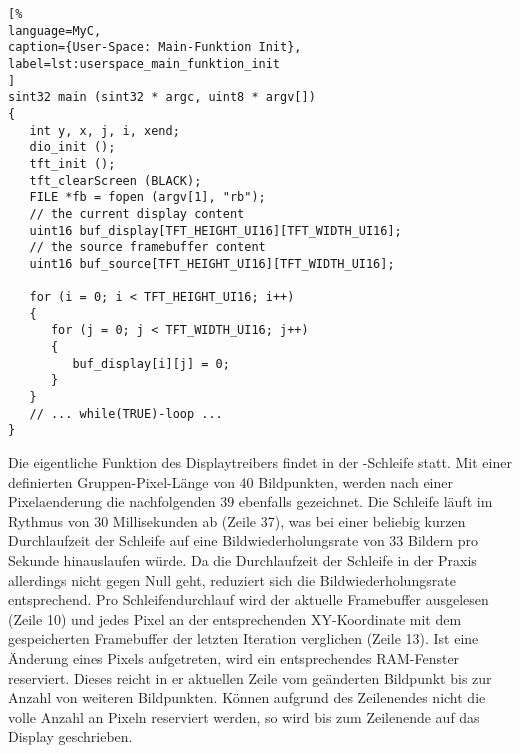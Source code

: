 \begin{lstlisting}[%
language=MyC,
caption={User-Space: Main-Funktion Init},
label=lst:userspace_main_funktion_init
]
sint32 main (sint32 * argc, uint8 * argv[])
{
   int y, x, j, i, xend;
   dio_init ();
   tft_init ();
   tft_clearScreen (BLACK);	   
   FILE *fb = fopen (argv[1], "rb");
   // the current display content
   uint16 buf_display[TFT_HEIGHT_UI16][TFT_WIDTH_UI16];
   // the source framebuffer content   
   uint16 buf_source[TFT_HEIGHT_UI16][TFT_WIDTH_UI16];

   for (i = 0; i < TFT_HEIGHT_UI16; i++)
   {
      for (j = 0; j < TFT_WIDTH_UI16; j++)
      {
         buf_display[i][j] = 0;
      }
   }
   // ... while(TRUE)-loop ...
}
\end{lstlisting}
Die eigentliche Funktion des Displaytreibers findet in der -Schleife statt. Mit einer definierten Gruppen-Pixel-Länge  von 40 Bildpunkten, werden nach einer Pixelaenderung die nachfolgenden 39 ebenfalls gezeichnet. Die Schleife läuft im Rythmus von 30 Millisekunden ab (Zeile 37), was bei einer  beliebig kurzen Durchlaufzeit der Schleife auf eine Bildwiederholungsrate von 33 Bildern pro Sekunde hinauslaufen würde. Da die Durchlaufzeit der Schleife in der Praxis allerdings nicht gegen Null geht, reduziert sich die Bildwiederholungsrate entsprechend. Pro Schleifendurchlauf wird der aktuelle Framebuffer ausgelesen (Zeile 10) und jedes Pixel an der entsprechenden XY-Koordinate mit dem gespeicherten Framebuffer der letzten Iteration verglichen (Zeile 13). Ist eine Änderung eines Pixels aufgetreten, wird ein entsprechendes RAM-Fenster reserviert. Dieses reicht in er aktuellen Zeile vom geänderten Bildpunkt bis zur Anzahl von  weiteren Bildpunkten. Können aufgrund des Zeilenendes nicht die volle Anzahl an Pixeln reserviert werden, so wird bis zum Zeilenende auf das Display geschrieben.

